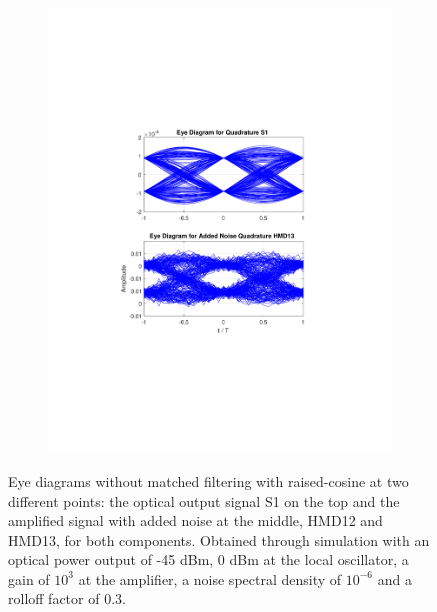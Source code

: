 \begin{figure}[H]
\begin{subfigure}{.45\textwidth}
		\includegraphics[clip, trim=5cm 4cm 5cm 4cm, width=\textwidth]{./sdf/m_qam_system/figures/eyes/q_n_nmf_45_60_rc.pdf}
	\end{subfigure}
	
	\caption{Eye diagrams without matched filtering with raised-cosine at
		two different points: the optical output signal S1 on the top and the amplified
		signal with added noise at the middle, HMD12 and HMD13, for
		both components. Obtained through simulation with an optical power output of
		-45 dBm, 0 dBm at the local oscillator, a gain of $10^3$ at the amplifier, a
		noise spectral density of $10^{-6}$ and a rolloff factor of
		0.3.\label{fig:eyes_n_rc_45_03}}
\end{figure}

